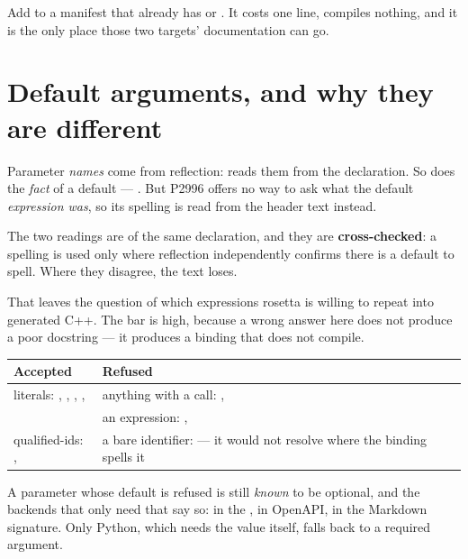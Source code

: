 \begin{note}
Add  to a manifest that already has  or
. It costs one line, compiles nothing, and it is the only place
those two targets' documentation can go.
\end{note}

\section{Default arguments, and why they are different}

Parameter \emph{names} come from reflection: 
reads them from the declaration. So does the \emph{fact} of a default ---
. But P2996 offers no way to ask what
the default \emph{expression was}, so its spelling is read from the header text
instead.

The two readings are of the same declaration, and they are
\textbf{cross-checked}: a spelling is used only where reflection independently
confirms there is a default to spell. Where they disagree, the text loses.

That leaves the question of which expressions rosetta is willing to repeat into
generated C++. The bar is high, because a wrong answer here does not produce a
poor docstring --- it produces a binding that does not compile.

\begin{center}
\small
\begin{tabular}{@{}L{6.6cm}L{7.2cm}@{}}
\toprule
\textbf{Accepted} & \textbf{Refused} \\
\midrule
literals: , , , ,
   &
  anything with a call: ,  \\
\addlinespace
\code{\{\}} &
  an expression: ,  \\
\addlinespace
qualified-ids: ,
   &
  a bare identifier:  --- it would not resolve where the
  binding spells it \\
\bottomrule
\end{tabular}
\end{center}

A parameter whose default is refused is still \emph{known} to be optional, and
the backends that only need that say so:  in the
,  in OpenAPI,  in the Markdown
signature. Only Python, which needs the value itself, falls back to a required
argument.

